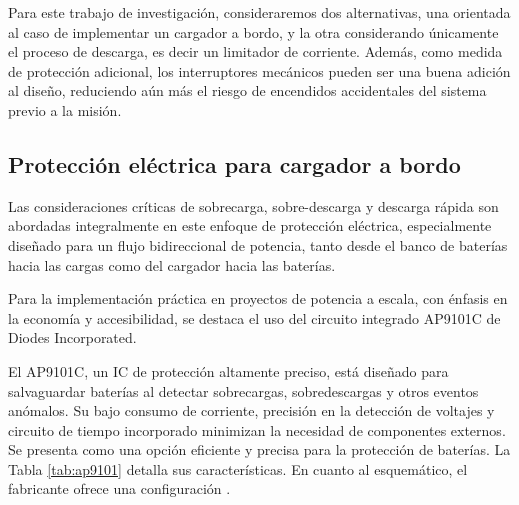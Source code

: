 Para este trabajo de investigación, consideraremos dos alternativas, una orientada al caso de implementar un cargador a bordo, y la otra considerando únicamente el proceso de descarga, es decir un limitador de corriente. Además, como medida de protección adicional, los interruptores mecánicos pueden ser una buena adición al diseño, reduciendo aún más el riesgo de encendidos accidentales del sistema previo a la misión. 

\subsection{Protección eléctrica para cargador a bordo}

Las consideraciones críticas de sobrecarga, sobre-descarga y descarga rápida son abordadas integralmente en este enfoque de protección eléctrica, especialmente diseñado para un flujo bidireccional de potencia, tanto desde el banco de baterías hacia las cargas como del cargador hacia las baterías.

Para la implementación práctica en proyectos de potencia a escala, con énfasis en la economía y accesibilidad, se destaca el uso del circuito integrado AP9101C de Diodes Incorporated.

El AP9101C, un IC de protección altamente preciso, está diseñado para salvaguardar baterías al detectar sobrecargas, sobredescargas y otros eventos anómalos. Su bajo consumo de corriente, precisión en la detección de voltajes y circuito de tiempo incorporado minimizan la necesidad de componentes externos. Se presenta como una opción eficiente y precisa para la protección de baterías. La Tabla \ref{tab:ap9101} detalla sus características. En cuanto al esquemático, el fabricante ofrece una configuración \cite{diodes2023ap9101c}.




